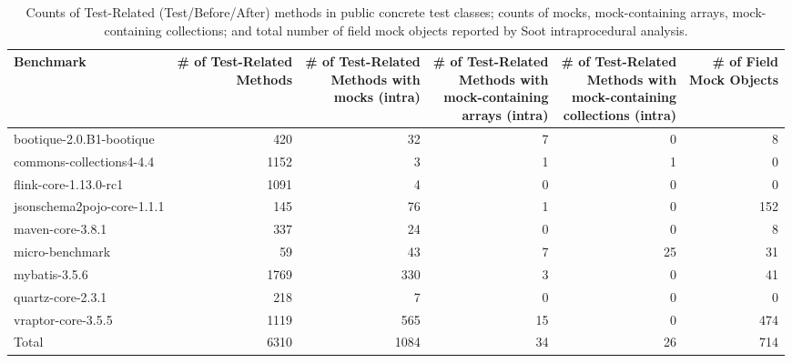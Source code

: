 \begin{table*}
	\centering
	\caption{Counts of Test-Related (Test/Before/After) methods in public concrete test classes; counts of mocks, mock-containing arrays, mock-containing collections; and total number of field mock objects reported by Soot intraprocedural analysis.}
	\begin{tabular}{lrrrrr}
		\toprule
		Benchmark & \thead{\# of Test-Related \\ Methods} & \thead{\# of Test-Related \\ Methods with \\ mocks (intra)}  & \thead{\# of Test-Related \\ Methods with \\ mock-containing\\ arrays (intra)} & \thead{\# of Test-Related \\ Methods with \\ mock-containing\\ collections (intra)} & \thead{\# of Field \\ Mock Objects} \\
		\midrule
		bootique-2.0.B1-bootique           		&  420        &  32  & 7 & 0     &   8   \\
		commons-collections4-4.4          		&  1152       &  3   & 1 & 1     &   0   \\
		flink-core-1.13.0-rc1           		&  1091       &  4   & 0 & 0     &   0   \\
		jsonschema2pojo-core-1.1.1           	&  145        &  76  & 1 & 0     &   152  \\
		maven-core-3.8.1	           			&  337        &  24  & 0 & 0     &   8    \\
		micro-benchmark         		  		&  59         &  43  & 7 & 25    &   31   \\
		mybatis-3.5.6         		  			&  1769       &  330 & 3 & 0     &   41   \\	
		quartz-core-2.3.1         	  			&  218     	  &  7   & 0 & 0     &   0    \\
		vraptor-core-3.5.5         	  			&  1119       &  565 & 15 & 0    &   474  \\
		\bottomrule
		Total        	  						&  6310       &  1084  & 34 & 26  &  714   \\
	\end{tabular}
	\label{tab:mocks}
\end{table*}

